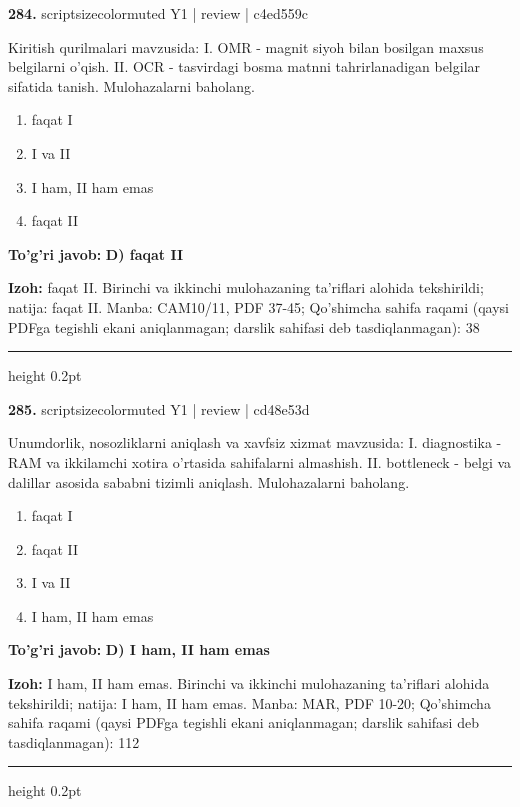 \documentclass[10pt,a4paper]{article}
\begin{document}
{\bfseries\sffamily\color{ink} 284.} {scriptsizecolor{muted} Y1 | review | c4ed559c}
\par
Kiritish qurilmalari mavzusida: I. OMR - magnit siyoh bilan bosilgan maxsus belgilarni o'qish. II. OCR - tasvirdagi bosma matnni tahrirlanadigan belgilar sifatida tanish. Mulohazalarni baholang.
\begin{enumerate}[label=\Alph*),leftmargin=9mm]
\item faqat I
\item I va II
\item I ham, II ham emas
\item faqat II
\end{enumerate}
\begin{tcolorbox}[enhanced,breakable,colback=teal!4,colframe=teal!60!black,boxrule=0.45pt,arc=1.2mm,left=2.7mm,right=2.7mm,top=1.8mm,bottom=1.8mm,before skip=2mm,after skip=2mm]
{\bfseries\sffamily\color{teal}To'g'ri javob:} \textbf{D) faqat II}
\par\smallskip
{\bfseries Izoh:} faqat II. Birinchi va ikkinchi mulohazaning ta'riflari alohida tekshirildi; natija: faqat II. Manba: CAM10/11, PDF 37-45; Qo'shimcha sahifa raqami (qaysi PDFga tegishli ekani aniqlanmagan; darslik sahifasi deb tasdiqlanmagan): 38
\end{tcolorbox}
\vspace{2mm}\hrule height 0.2pt\vspace{3mm}

{\bfseries\sffamily\color{ink} 285.} {scriptsizecolor{muted} Y1 | review | cd48e53d}
\par
Unumdorlik, nosozliklarni aniqlash va xavfsiz xizmat mavzusida: I. diagnostika - RAM va ikkilamchi xotira o'rtasida sahifalarni almashish. II. bottleneck - belgi va dalillar asosida sababni tizimli aniqlash. Mulohazalarni baholang.
\begin{enumerate}[label=\Alph*),leftmargin=9mm]
\item faqat I
\item faqat II
\item I va II
\item I ham, II ham emas
\end{enumerate}
\begin{tcolorbox}[enhanced,breakable,colback=teal!4,colframe=teal!60!black,boxrule=0.45pt,arc=1.2mm,left=2.7mm,right=2.7mm,top=1.8mm,bottom=1.8mm,before skip=2mm,after skip=2mm]
{\bfseries\sffamily\color{teal}To'g'ri javob:} \textbf{D) I ham, II ham emas}
\par\smallskip
{\bfseries Izoh:} I ham, II ham emas. Birinchi va ikkinchi mulohazaning ta'riflari alohida tekshirildi; natija: I ham, II ham emas. Manba: MAR, PDF 10-20; Qo'shimcha sahifa raqami (qaysi PDFga tegishli ekani aniqlanmagan; darslik sahifasi deb tasdiqlanmagan): 112
\end{tcolorbox}
\vspace{2mm}\hrule height 0.2pt\vspace{3mm}
\end{document}
